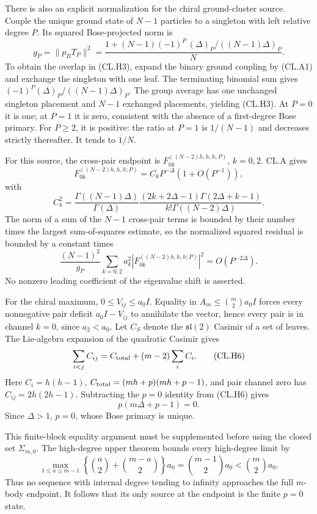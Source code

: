\documentclass[a4paper,11pt]{article}
\numberwithin{equation}{section}
\begin{document}
There is also an explicit normalization for the chiral ground-cluster source. Couple the unique ground state of \(N-1\) particles to a singleton with left relative degree \(P\). Its squared Bose-projected norm is \[
g_P=\|p_BT_P\|^2
=\frac{1+(N-1)(-1)^P\,(\Delta)_P/((N-1)\Delta)_P}{N}.
\tag{CL.H3}
\] To obtain the overlap in (CL.H3), expand the binary ground coupling by (CL.A1) and exchange the singleton with one leaf. The terminating binomial sum gives \((-1)^P(\Delta)_P/((N-1)\Delta)_P\). The group average has one unchanged singleton placement and \(N-1\) exchanged placements, yielding (CL.H3). At \(P=0\) it is one; at \(P=1\) it is zero, consistent with the absence of a first-degree Bose primary. For \(P\geq2\), it is positive: the ratio at \(P=1\) is \(1/(N-1)\) and decreases strictly thereafter. It tends to \(1/N\).

For this source, the cross-pair endpoint is \(F_{0k}^{((N-2)h,h,h;P)}\), \(k=0,2\). CL.A gives \[
F_{0k}^{((N-2)h,h,h;P)}
=C_kP^{-\Delta}(1+O(P^{-1})),
\] with \[
C_k^2=
\frac{\Gamma((N-1)\Delta)}{\Gamma(\Delta)}
\frac{(2k+2\Delta-1)\Gamma(2\Delta+k-1)}
{k!\Gamma((N-2)\Delta)}.
\tag{CL.H4}
\] The norm of a sum of the \(N-1\) cross-pair terms is bounded by their number times the largest sum-of-squares estimate, so the normalized squared residual is bounded by a constant times \[
\frac{(N-1)^2}{g_P}
\sum_{k=0,2}a_k^2|F_{0k}^{((N-2)h,h,h;P)}|^2
=O(P^{-2\Delta}).
\tag{CL.H5}
\] No nonzero leading coefficient of the eigenvalue shift is asserted.

For the chiral maximum, \(0\leq V_{ij}\leq a_0I\). Equality in \(A_m\leq\binom m2a_0I\) forces every nonnegative pair deficit \(a_0I-V_{ij}\) to annihilate the vector, hence every pair is in channel \(k=0\), since \(a_2<a_0\). Let \(C_S\) denote the \(\mathfrak{sl}(2)\) Casimir of a set of leaves. The Lie-algebra expansion of the quadratic Casimir gives \[
\sum_{i<j}C_{ij}=C_{\rm total}+(m-2)\sum_iC_i.
\tag{CL.H6}
\] Here \(C_i=h(h-1)\), \(C_{\rm total}=(mh+p)(mh+p-1)\), and pair channel zero has \(C_{ij}=2h(2h-1)\). Subtracting the \(p=0\) identity from (CL.H6) gives \[
p(m\Delta+p-1)=0.
\] Since \(\Delta>1\), \(p=0\), whose Bose primary is unique.

This finite-block equality argument must be supplemented before using the closed set \(\Sigma_{m,0}\). The high-degree upper theorem bounds every high-degree limit by \[
\max_{1\leq a\leq m-1}
\left\{\binom a2+\binom{m-a}{2}\right\}a_0
=\binom{m-1}{2}a_0
<\binom m2a_0.
\tag{CL.H7}
\] Thus no sequence with internal degree tending to infinity approaches the full \(m\)-body endpoint. It follows that its only source at the endpoint is the finite \(p=0\) state.
\end{document}
